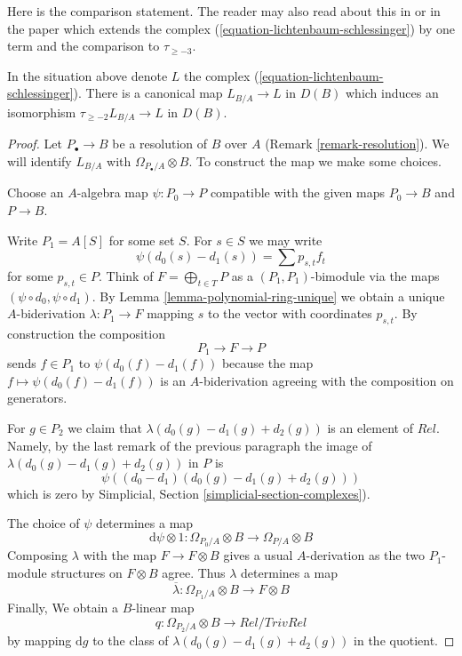 \noindent
Here is the comparison statement. The reader may also read about this
in \cite[page 206, Proposition 12]{Andre-Homologie} or in the paper
\cite{Doncel} which extends the complex
(\ref{equation-lichtenbaum-schlessinger}) by one term and the comparison
to $\tau_{\geq -3}$.

\begin{lemma}
\label{lemma-compare-higher}
In the situation above denote $L$ the complex
(\ref{equation-lichtenbaum-schlessinger}).
There is a canonical map $L_{B/A} \to L$ in $D(B)$ which
induces an isomorphism $\tau_{\geq -2}L_{B/A} \to L$ in $D(B)$.
\end{lemma}

\begin{proof}
Let $P_\bullet \to B$ be a resolution of $B$ over $A$
(Remark \ref{remark-resolution}). We will identify $L_{B/A}$ with
$\Omega_{P_\bullet/A} \otimes B$. To construct the map we
make some choices.

\medskip\noindent
Choose an $A$-algebra map $\psi : P_0 \to P$ compatible with the
given maps $P_0 \to B$ and $P \to B$.

\medskip\noindent
Write $P_1 = A[S]$ for some set $S$. For $s \in S$ we may write
$$
\psi(d_0(s) - d_1(s)) = \sum p_{s, t} f_t
$$
for some $p_{s, t} \in P$. Think of $F = \bigoplus_{t \in T} P$
as a $(P_1, P_1)$-bimodule via the maps $(\psi \circ d_0, \psi \circ d_1)$.
By Lemma \ref{lemma-polynomial-ring-unique} we obtain a unique
$A$-biderivation $\lambda : P_1 \to F$ mapping $s$ to the vector with
coordinates $p_{s, t}$. By construction the composition
$$
P_1 \longrightarrow F \longrightarrow P
$$
sends $f \in P_1$ to $\psi(d_0(f) - d_1(f))$ because the map
$f \mapsto \psi(d_0(f) - d_1(f))$ is an $A$-biderivation agreeing with
the composition on generators.

\medskip\noindent
For $g \in P_2$ we claim that $\lambda(d_0(g) - d_1(g) + d_2(g))$
is an element of $Rel$. Namely, by the last remark of the previous
paragraph the image of $\lambda(d_0(g) - d_1(g) + d_2(g))$ in $P$ is
$$
\psi((d_0 - d_1)(d_0(g) - d_1(g) + d_2(g)))
$$
which is zero by Simplicial, Section \ref{simplicial-section-complexes}).

\medskip\noindent
The choice of $\psi$ determines a map
$$
\text{d}\psi \otimes 1 :
\Omega_{P_0/A} \otimes B
\longrightarrow
\Omega_{P/A} \otimes B
$$
Composing $\lambda$ with the map $F \to F \otimes B$ gives a
usual $A$-derivation as the two $P_1$-module structures on
$F \otimes B$ agree. Thus $\lambda$ determines a map
$$
\overline{\lambda} :
\Omega_{P_1/A} \otimes B
\longrightarrow
F \otimes B
$$
Finally, We obtain a $B$-linear map
$$
q :
\Omega_{P_2/A} \otimes B
\longrightarrow
Rel/TrivRel
$$
by mapping $\text{d}g$ to the class of $\lambda(d_0(g) - d_1(g) + d_2(g))$
in the quotient.


\end{proof}
